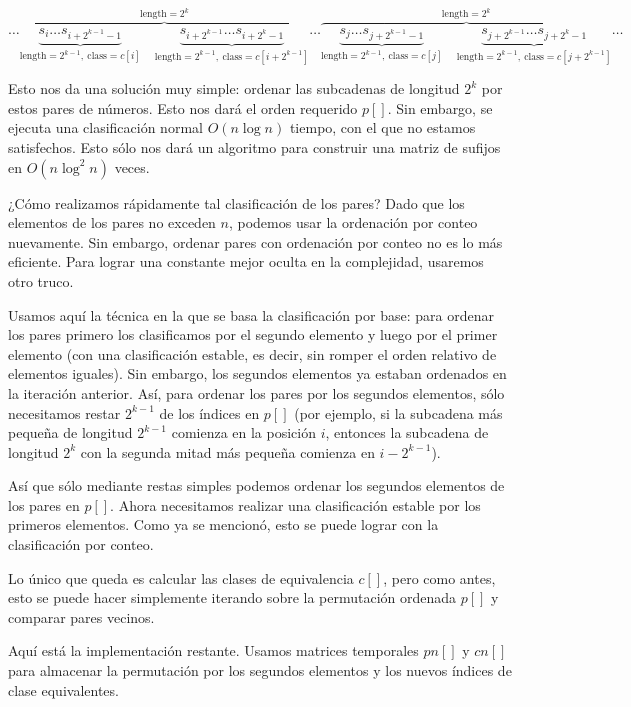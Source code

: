 $$\dots \overbrace{ \underbrace{s_i \dots s_{i+2^{k-1}-1}}_{\text{length} = 2^{k-1},~ \text{class} = c[i]} \quad \underbrace{s_{i+2^{k-1}} \dots s_{i+2^k-1}}_{\text{length} = 2^{k-1},~ \text{class} = c[i + 2^{k-1}]} }^{\text{length} = 2^k} \dots \overbrace{ \underbrace{s_j \dots s_{j+2^{k-1}-1}}_{\text{length} = 2^{k-1},~ \text{class} = c[j]} \quad \underbrace{s_{j+2^{k-1}} \dots s_{j+2^k-1}}_{\text{length} = 2^{k-1},~ \text{class} = c[j + 2^{k-1}]} }^{\text{length} = 2^k} \dots$$

Esto nos da una solución muy simple: ordenar las subcadenas de longitud $2^k$ por estos pares de números. Esto nos dará el orden requerido $p[]$. Sin embargo, se ejecuta una clasificación normal $O(n \log n)$ tiempo, con el que no estamos satisfechos. Esto sólo nos dará un algoritmo para construir una matriz de sufijos en $O(n\log^2n)$ veces.

¿Cómo realizamos rápidamente tal clasificación de los pares? Dado que los elementos de los pares no exceden $n$, podemos usar la ordenación por conteo 
nuevamente. Sin embargo, ordenar pares con ordenación por conteo no es lo más eficiente. Para lograr una constante mejor oculta en la complejidad, usaremos 
otro truco.

Usamos aquí la técnica en la que se basa la clasificación por base: para ordenar los pares primero los clasificamos por el segundo elemento y luego por el 
primer elemento (con una clasificación estable, es decir, sin romper el orden relativo de elementos iguales). Sin embargo, los segundos elementos ya estaban 
ordenados en la iteración anterior. Así, para ordenar los pares por los segundos elementos, sólo necesitamos restar $2^{k-1}$ de los índices en $p[]$ (por 
ejemplo, si la subcadena más pequeña de longitud $2^{k-1}$ comienza en la posición $i$, entonces la subcadena de longitud $2^k$ con la segunda mitad más 
pequeña comienza en $i-2^{k-1}$).

Así que sólo mediante restas simples podemos ordenar los segundos elementos de los pares en $p[]$. Ahora necesitamos realizar una clasificación estable por
los primeros elementos. Como ya se mencionó, esto se puede lograr con la clasificación por conteo.

Lo único que queda es calcular las clases de equivalencia $c[]$, pero como antes, esto se puede hacer simplemente iterando sobre la permutación ordenada
$p[]$ y comparar pares vecinos.

Aquí está la implementación restante. Usamos matrices temporales $pn[]$ y $cn[]$ para almacenar la permutación por los segundos elementos y los nuevos índices 
de clase equivalentes.


